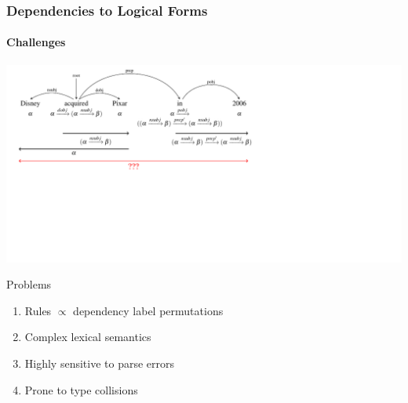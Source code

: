 \documentclass[mathserif,12pt]{beamer}
\begin{document}
\begin{frame}[noframenumbering]
\frametitle{Dependencies to Logical Forms}
\framesubtitle{Challenges}
\begin{center}
\vspace{-2.5cm} \includegraphics[trim=1.7em 20.7em 20em 0em,clip=true,scale=1]{figures/pixar_bad_typing_prep_derivation_wrong}
\end{center}

{
\begin{alertblock}{\small Problems}
  \footnotesize
  \begin{enumerate}
   \item Rules $\propto$ dependency label permutations
   \item Complex lexical semantics
   \item Highly sensitive to parse errors
   \item Prone to type collisions
  \end{enumerate}
\end{alertblock}
}
\end{frame}
\end{document}
